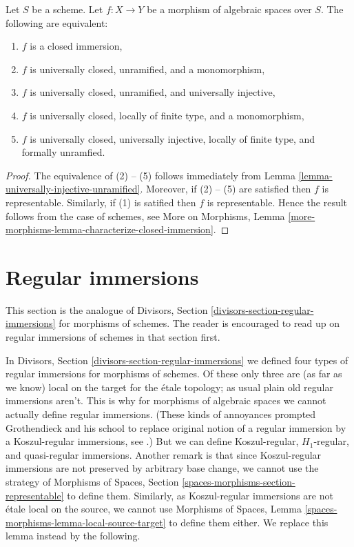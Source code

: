\begin{lemma}
\label{lemma-characterize-closed-immersion}
Let $S$ be a scheme.
Let $f : X \to Y$ be a morphism of algebraic spaces over $S$.
The following are equivalent:
\begin{enumerate}
\item $f$ is a closed immersion,
\item $f$ is universally closed, unramified, and a monomorphism,
\item $f$ is universally closed, unramified, and universally injective,
\item $f$ is universally closed, locally of finite type, and a monomorphism,
\item $f$ is universally closed, universally injective, locally of
finite type, and formally unramfied.
\end{enumerate}
\end{lemma}

\begin{proof}
The equivalence of (2) -- (5) follows immediately from
Lemma \ref{lemma-universally-injective-unramified}.
Moreover, if (2) -- (5) are satisfied then $f$ is representable.
Similarly, if (1) is satified then $f$ is representable.
Hence the result follows from the case of schemes, see
More on Morphisms,
Lemma \ref{more-morphisms-lemma-characterize-closed-immersion}.
\end{proof}








\section{Regular immersions}
\label{section-regular-immersions}

\noindent
This section is the analogue of
Divisors, Section \ref{divisors-section-regular-immersions}
for morphisms of schemes. The reader is encouraged to read up
on regular immersions of schemes in that section first.

\medskip\noindent
In
Divisors, Section \ref{divisors-section-regular-immersions}
we defined four types of regular immersions for morphisms of schemes.
Of these only three are (as far as we know) local on the target for 
the \'etale topology; as usual plain old regular immersions aren't.
This is why for morphisms of algebraic spaces we cannot actually define
regular immersions. (These kinds of annoyances prompted Grothendieck
and his school to replace original notion of a regular immersion by a
Koszul-regular immersions, see
\cite[Exposee VII, Definition 1.4]{SGA6}.)
But we can define Koszul-regular, $H_1$-regular, and quasi-regular immersions.
Another remark is that since Koszul-regular immersions are not preserved by
arbitrary base change, we cannot use the strategy of
Morphisms of Spaces, Section \ref{spaces-morphisms-section-representable}
to define them. Similarly, as Koszul-regular immersions are not \'etale local
on the source, we cannot use
Morphisms of Spaces, Lemma \ref{spaces-morphisms-lemma-local-source-target}
to define them either. We replace this lemma instead by the
following.

